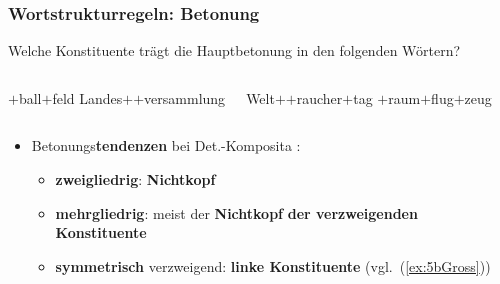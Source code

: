 \begin{frame}
\frametitle{Wortstrukturregeln: Betonung}

Welche Konstituente trägt die Hauptbetonung in den folgenden Wörtern?

\begin{columns}
	\ea\label{ex:5bFuss} $+$ball$+$feld
	\ex\label{ex:5bLandes} Landes$+$$+$versammlung
	\z 

	\ea\label{ex:5bWelt} Welt$+$$+$raucher$+$tag
	\ex\label{ex:5bGross} $+$raum$+$flug$+$zeug
	\z 
\end{columns}

\pause 

\begin{itemize}
	\item Betonungs\textbf{tendenzen} bei Det.-Komposita \citep[vgl.][131ff]{Grewendorf&Co91a}:
	\begin{itemize}
		
		\item \textbf{zweigliedrig}: \textbf{Nichtkopf}
	
		\item \textbf{mehrgliedrig}: meist der \textbf{Nichtkopf} \textbf{der verzweigenden Konstituente}
				
		\item \textbf{symmetrisch} verzweigend: \textbf{linke Konstituente} (vgl.\ (\ref{ex:5bGross}))
		
		
	\end{itemize}
\end{itemize}

\begin{minipage}[t]{.17\textwidth}
\end{minipage}
\hfill ~
\begin{minipage}[t]{.25\textwidth}
\end{minipage}
\hfill ~
\begin{minipage}[t]{.21\textwidth}
\end{minipage}
\hfill ~
\begin{minipage}[t]{.28\textwidth}
\end{minipage}
	

\end{frame}
